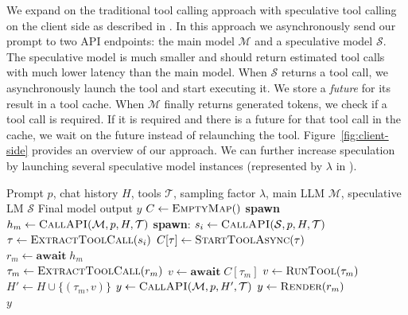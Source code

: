 We expand on the traditional tool calling approach with speculative tool calling on the client side as described in .
In this approach we asynchronously send our prompt to two API endpoints: the main model $\mathcal{M}$ and a speculative model $\mathcal{S}$.
The speculative model is much smaller and should return estimated tool calls with much lower latency than the main model.
When $\mathcal{S}$ returns a tool call, we asynchronously launch the tool and start executing it.
We store a {\it future} for its result in a tool cache.
When $\mathcal{M}$ finally returns generated tokens, we check if a tool call is required.
If it is required and there is a future for that tool call in the cache, we wait on the future instead of relaunching the tool. Figure~\ref{fig:client-side} provides an overview of our approach.
We can further increase speculation by launching several speculative model instances (represented by $\lambda$ in ).

\begin{algorithm}[!htbp]
\caption{Client-side Speculative Tool-Calling}
\label{alg:spec-tool-cache}
\begin{algorithmic}[1]
    \Require Prompt $p$, chat history $H$, tools $\mathcal{T}$, sampling factor $\lambda$, main LLM $\mathcal{M}$, speculative LM $\mathcal{S}$
    \Ensure Final model output $y$
    \State $C \gets \textsc{EmptyMap}()$ 
    \State \textbf{spawn} $h_m \gets \textsc{CallAPI}(\mathcal{M}, p, H, \mathcal{T})$ 
     
      \State \textbf{spawn}:
      \Statex \hspace{1.2em} $s_i \gets \textsc{CallAPI}(\mathcal{S}, p, H, \mathcal{T})$
        \State $\tau \gets \textsc{ExtractToolCall}(s_i)$
          \State $C[\tau] \gets \textsc{StartToolAsync}(\tau)$ 
        \EndIf
      \EndIf
    \EndFor
    \\
    \State $r_m \gets \textbf{await}\; h_m$ 
    \\
      \State $\tau_m \gets \textsc{ExtractToolCall}(r_m)$
        \State $v \gets \textbf{await}\; C[\tau_m]$ 
      \Else
        \State $v \gets \textsc{RunTool}(\tau_m)$ 
      \EndIf
      \State $H' \gets H \cup \{(\tau_m, v)\}$ 
      \State $y \gets \textsc{CallAPI}(\mathcal{M}, p, H', \mathcal{T})$ 
    \Else
      \State $y \gets \textsc{Render}(r_m)$ 
    \EndIf
    \\
    \State \Return $y$
\end{algorithmic}
\end{algorithm}

